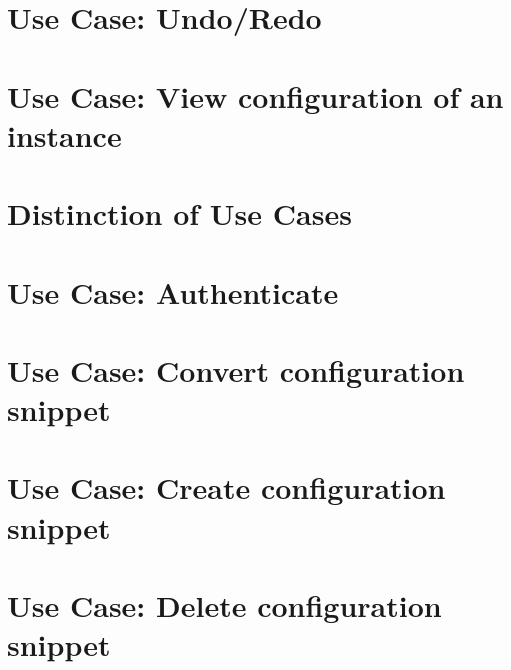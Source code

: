\documentclass[twoside]{book}
\newcommand{\+}{\discretionary{\mbox{\scriptsize$\hookleftarrow$}}{}{}}
\begin{document}
\chapter{Use Case\+: Undo/\+Redo}
\label{doc_usecases_elektra_web_UC_undo_redo_md}

\chapter{Use Case\+: View configuration of an instance}
\label{doc_usecases_elektra_web_UC_view_config_md}

\chapter{Distinction of Use Cases}
\label{doc_usecases_snippet_sharing_distinction_use_cases_md}

\chapter{Use Case\+: Authenticate}
\label{doc_usecases_snippet_sharing_UC_authenticate_md}

\chapter{Use Case\+: Convert configuration snippet}
\label{doc_usecases_snippet_sharing_UC_convert_snippet_md}

\chapter{Use Case\+: Create configuration snippet}
\label{doc_usecases_snippet_sharing_UC_create_snippet_md}

\chapter{Use Case\+: Delete configuration snippet}
\label{doc_usecases_snippet_sharing_UC_delete_snippet_md}

\end{document}
